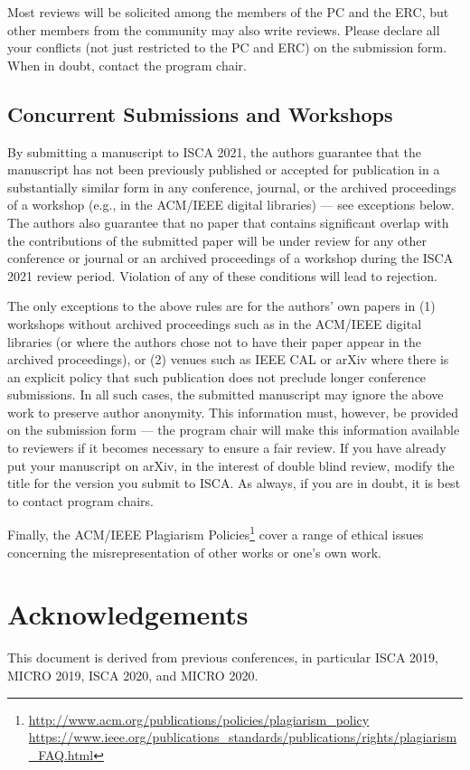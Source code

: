 \documentclass[conference]{IEEEtran}
\begin{document}
Most reviews will be solicited among the members of the PC and the ERC, but other
members from the community may also write reviews. Please declare all
your conflicts (not just restricted to the PC and ERC) on the
submission form. When in doubt, contact the program chair.


\subsection{Concurrent Submissions and Workshops}
By submitting a manuscript to ISCA 2021, the authors guarantee that
the manuscript has not been previously published or accepted for
publication in a substantially similar form in any conference,
journal, or the archived proceedings of a workshop (e.g., in the
ACM/IEEE digital libraries) --- see exceptions below. The authors also
guarantee that no paper that contains significant overlap with the
contributions of the submitted paper will be under review for any
other conference or journal or an archived proceedings of a workshop
during the ISCA 2021 review period. Violation of any of these
conditions will lead to rejection.

The only exceptions to the above rules are for the authors' own papers
in (1) workshops without archived proceedings such as in the ACM/IEEE
digital libraries (or where the authors chose not to have their paper
appear in the archived proceedings), or (2) venues such as IEEE CAL or
arXiv where there is an explicit policy that such publication does not
preclude longer conference submissions.  In all such cases, the
submitted manuscript may ignore the above work to preserve author
anonymity. This information must, however, be provided on the
submission form --- the program chair will make this information available
to reviewers if it becomes necessary to ensure a fair review.
If you have already put your manuscript on arXiv, in the interest of
double blind review, modify the title for the version you submit to ISCA.
As always, if you are in doubt, it is best to contact program chairs.


Finally, the ACM/IEEE Plagiarism Policies\footnote{\url{http://www.acm.org/publications/policies/plagiarism_policy}\\
\url{https://www.ieee.org/publications_standards/publications/rights/plagiarism_FAQ.html}}
cover a range of ethical issues concerning the misrepresentation of
other works or one's own work.


\section*{Acknowledgements}
This document is derived from previous conferences, in particular ISCA
2019, MICRO 2019, ISCA 2020, and MICRO 2020.





\end{document}
